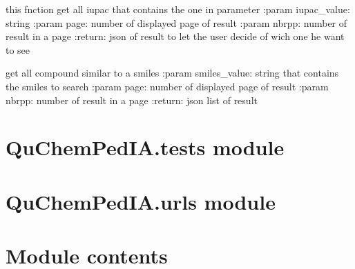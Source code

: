 \documentclass[letterpaper,10pt,english]{sphinxmanual}
\begin{document}

\begin{fulllineitems}
\label{\detokenize{QuChemPedIA:QuChemPedIA.search.search_iupac}}
this fnction get all iupac that contains the one in parameter
:param iupac\_value: string
:param page: number of displayed page of result
:param nbrpp: number of result in a page
:return: json of result to let the user decide of wich one he want to see

\end{fulllineitems}


\begin{fulllineitems}
\label{\detokenize{QuChemPedIA:QuChemPedIA.search.search_smiles}}
get all compound similar to a smiles
:param smiles\_value: string that contains the smiles to search
:param page: number of displayed page of result
:param nbrpp: number of result in a page
:return: json list of result

\end{fulllineitems}



\chapter{QuChemPedIA.tests module}
\label{\detokenize{QuChemPedIA:module-QuChemPedIA.tests}}\label{\detokenize{QuChemPedIA:quchempedia-tests-module}}

\chapter{QuChemPedIA.urls module}
\label{\detokenize{QuChemPedIA:module-QuChemPedIA.urls}}\label{\detokenize{QuChemPedIA:quchempedia-urls-module}}

\chapter{Module contents}
\label{\detokenize{QuChemPedIA:module-QuChemPedIA}}\label{\detokenize{QuChemPedIA:module-contents}}
\end{document}
